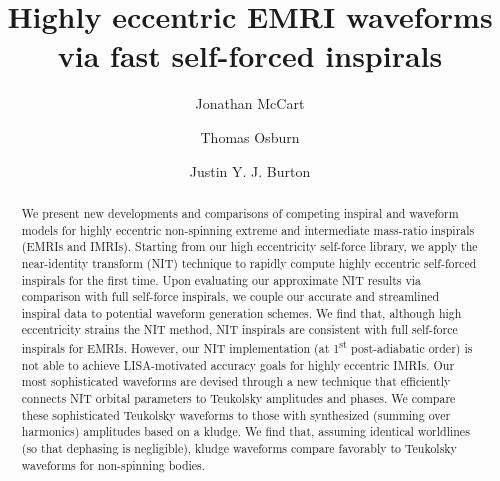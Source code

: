 \documentclass[aps,prd,twocolumn,showpacs,notitlepage,eqsecnum,
superscriptaddress,nofootinbib]{revtex4-1}
\begin{document}
\title{Highly eccentric EMRI waveforms via fast self-forced inspirals}

\author{Jonathan McCart}
\author{Thomas Osburn}
\author{Justin Y. J. Burton}

\begin{abstract}

We present new developments and comparisons of competing inspiral and waveform models for highly eccentric non-spinning extreme and intermediate mass-ratio inspirals (EMRIs and IMRIs). Starting from our high eccentricity self-force library, we apply the near-identity transform (NIT) technique to rapidly compute highly eccentric self-forced inspirals for the first time. Upon evaluating our approximate NIT results via comparison with full self-force inspirals, we couple our accurate and streamlined inspiral data to potential waveform generation schemes. We find that, although high eccentricity strains the NIT method, NIT inspirals are consistent with full self-force inspirals for EMRIs. However, our NIT implementation (at 1\textsuperscript{st} post-adiabatic order) is not able to achieve LISA-motivated accuracy goals for highly eccentric IMRIs. Our most sophisticated waveforms are devised through a new technique that efficiently connects NIT orbital parameters to Teukolsky amplitudes and phases. We compare these sophisticated Teukolsky waveforms to those with synthesized (summing over harmonics) amplitudes based on a kludge. We find that, assuming identical worldlines (so that dephasing is negligible), kludge waveforms compare favorably to Teukolsky waveforms for non-spinning bodies.

\end{abstract}

\maketitle
\end{document}
